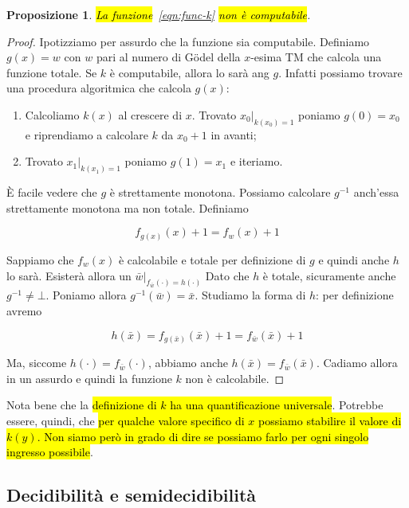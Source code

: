 \documentclass[a4paper,11pt,twoside]{article}
\theoremstyle{plain}
\newtheorem{prop}{Proposizione}[section]
\theoremstyle{definition}
\theoremstyle{remark}
\begin{document}
\begin{prop}
  \hl{La funzione}~\ref{eqn:func-k} \hl{non è computabile}.
\end{prop}
\begin{proof}
  Ipotizziamo per assurdo che la funzione sia computabile. Definiamo $g(x) = w$
  con $w$ pari al numero di Gödel della $x$-esima TM che calcola una funzione
  totale. Se $k$ è computabile, allora lo sarà ang $g$. Infatti possiamo trovare
  una procedura algoritmica che calcola $g(x)$:

  \begin{enumerate}
    \item Calcoliamo $k(x)$ al crescere di $x$. Trovato $x_0|_{k(x_0)=1}$
      poniamo $g(0) = x_0$ e riprendiamo a calcolare $k$ da $x_0 + 1$ in avanti;
    \item Trovato $x_1|_{k(x_1)=1}$ poniamo $g(1) = x_1$ e iteriamo.
  \end{enumerate}

  È facile vedere che $g$ è strettamente monotona. Possiamo calcolare $g^{-1}$
  anch'essa strettamente monotona ma non totale. Definiamo

  \[
    f_{g(x)}(x) +1 = f_w(x) +1
  \]

  Sappiamo che $f_w(x)$ è calcolabile e totale per definizione di $g$ e quindi
  anche $h$ lo sarà. Esisterà allora un $\bar{w}|_{f_{\bar{w}}(\cdot)=h(\cdot)}$
  Dato che $h$ è totale, sicuramente anche $g^{-1} \neq \bot$. Poniamo allora
  $g^{-1}(\bar{w})=\bar{x}$. Studiamo la forma di $h$: per definizione avremo

  \[
    h(\bar{x})=f_{g(\bar{x})}(\bar{x}) + 1 = f_{\bar{w}}(\bar{x}) +1
  \]

  Ma, siccome $h(\cdot) = f_{\bar{w}}(\cdot)$, abbiamo anche $h(\bar{x}) =
  f_{\bar{w}}(\bar{x})$. Cadiamo allora in un assurdo e quindi la funzione $k$
  non è calcolabile.
\end{proof}

Nota bene che la \hl{definizione di $k$ ha una quantificazione universale}.
Potrebbe essere, quindi, che \hl{per qualche valore specifico di $x$ possiamo
stabilire il valore di $k(y)$. Non siamo però in grado di dire se possiamo farlo
per ogni singolo ingresso possibile}.

\subsection{Decidibilità e semidecidibilità}\label{sec:problemi-decisione}
\end{document}
